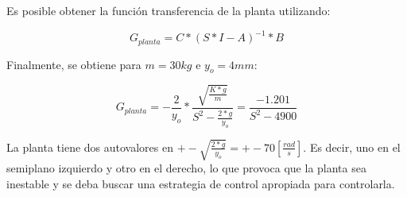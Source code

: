 \noindent Es posible obtener la función transferencia de la planta utilizando:

\begin{equation}\label{eq_transferencia_planta}
	G_{planta}=C*(S*I-A)^{-1}*B
\end{equation}

\noindent Finalmente, se obtiene para $m=30kg$ e $y_{o}=4mm$:

\begin{equation}
	G_{planta}=-\frac{2}{y_{o}}*\frac{\sqrt{\frac{K*g}{m}}}{S^2-\frac{2*g}{y_{o}}}=\frac{-1.201}{S^{2}-4900}
\end{equation}

\noindent La planta tiene dos autovalores en $+-\sqrt{\frac{2*g}{y_{o}}}=+-70[\frac{rad}{s}]$. Es decir, uno en el semiplano izquierdo y otro en el derecho, lo que provoca que la planta sea inestable y se deba buscar una estrategia de control apropiada para controlarla.
